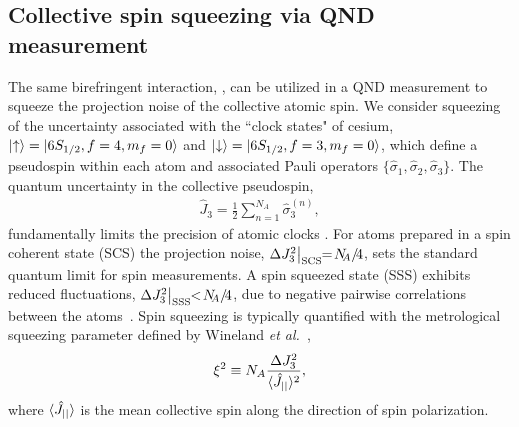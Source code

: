 \documentclass[aps,pra,twocolumn]{revtex4-1} %
\newcommand{\scs}{{\rm SCS}}
\newcommand{\varz}{\Delta J_3^2}
\newcommand{\jz}{\hat{J}_3}
\begin{document}
	\subsection{Collective spin squeezing via QND measurement}

The same birefringent interaction, , can be utilized in a QND measurement to squeeze the projection noise of the collective atomic spin.  We consider squeezing of the uncertainty associated with the ``clock states" of cesium, $\lvert{\uparrow}\rangle = \lvert{6S_{1/2}, f=4, m_f=0}\rangle$ and $\lvert{\downarrow}\rangle = \lvert{6S_{1/2}, f=3, m_f=0}\rangle$, which define a pseudospin within each atom and associated Pauli operators $\{\hat{\sigma}_1, \hat{\sigma}_2, \hat{\sigma}_3\}$.  The quantum uncertainty in the collective pseudospin,
	\begin{align}
		\jz = \frac{1}{2} \sum_{n=1}^{N_A} \hat{\sigma}_3^{(n)},  
	\end{align}
fundamentally limits the precision of atomic clocks \cite{wineland_spin_1992}. For atoms prepared in a spin coherent state (SCS) the projection noise, $\varz \big|_{\scs} \!\!=\! N\!\!_A/\!4$, sets the standard quantum limit for spin measurements. A spin squeezed state (SSS) exhibits reduced fluctuations, $ \varz \big|_{\rm SSS}  \!\!<\! N\!\!_A/\!4$, due to negative pairwise correlations between the atoms~\cite{kitagawa_squeezed_1993}. Spin squeezing is typically quantified with the metrological squeezing parameter defined by Wineland \emph{et al.}~\cite{wineland_spin_1992},
	\begin{align} \label{Eq::SqueezingParameter}
		\xi^2 \equiv N_A \frac{ \varz }{ \expt{\hat{J}_{||}}^2 },
	\end{align}
where $\langle{\hat{J}_{||}}\rangle$ is the mean collective spin along the direction of spin polarization. 
\end{document}
